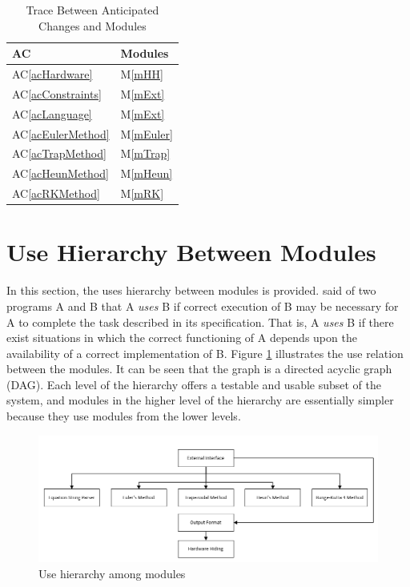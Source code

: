 \documentclass[12pt, titlepage]{article}
\newcommand{\acref}[1]{AC\ref{#1}}
\newcommand{\mref}[1]{M\ref{#1}}
\begin{document}
\begin{table}[H]
\centering
\begin{tabular}{p{} p{}}
\toprule
\textbf{AC} & \textbf{Modules}\\
\midrule
\acref{acHardware} & \mref{mHH}\\
\acref{acConstraints} & \mref{mExt}\\
\acref{acLanguage} & \mref{mExt}\\
\acref{acEulerMethod} & \mref{mEuler}\\
\acref{acTrapMethod} & \mref{mTrap}\\
\acref{acHeunMethod} & \mref{mHeun}\\
\acref{acRKMethod} & \mref{mRK}\\
\bottomrule
\end{tabular}
\caption{Trace Between Anticipated Changes and Modules}
\label{TblACT}
\end{table}

\section{Use Hierarchy Between Modules} \label{SecUse}

In this section, the uses hierarchy between modules is
provided. \citet{Parnas1978} said of two programs A and B that A {\em uses} B if
correct execution of B may be necessary for A to complete the task described in
its specification. That is, A {\em uses} B if there exist situations in which
the correct functioning of A depends upon the availability of a correct
implementation of B.  Figure \ref{FigUH} illustrates the use relation between
the modules. It can be seen that the graph is a directed acyclic graph
(DAG). Each level of the hierarchy offers a testable and usable subset of the
system, and modules in the higher level of the hierarchy are essentially simpler
because they use modules from the lower levels.

\begin{figure}[H]
\centering
\includegraphics[width=1.1\textwidth]{use.png}
\caption{Use hierarchy among modules}
\label{FigUH}
\end{figure}
\end{document}
